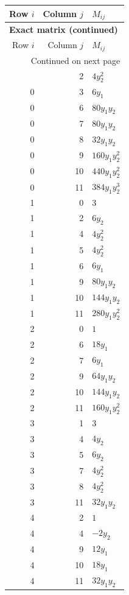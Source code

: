 \documentclass[10pt,a4paper]{article}
\begin{document}
{\small\setlength{\tabcolsep}{7pt}\begin{longtable}{rrp{125mm}}
\toprule Row $i$ & Column $j$ & $M_{ij}$\\\midrule\endfirsthead
\multicolumn{3}{l}{\textbf{Exact matrix (continued)}}\\
\toprule Row $i$ & Column $j$ & $M_{ij}$\\\midrule\endhead
\midrule\multicolumn{3}{r}{Continued on next page}\\\endfoot\bottomrule\endlastfoot
0 & 2 & $4 y_{2}^{2}$\\
0 & 3 & $6 y_{1}$\\
0 & 6 & $80 y_{1} y_{2}$\\
0 & 7 & $80 y_{1} y_{2}$\\
0 & 8 & $32 y_{1} y_{2}$\\
0 & 9 & $160 y_{1} y_{2}^{2}$\\
0 & 10 & $440 y_{1} y_{2}^{2}$\\
0 & 11 & $384 y_{1} y_{2}^{3}$\\
1 & 0 & $3$\\
1 & 2 & $6 y_{2}$\\
1 & 4 & $4 y_{2}^{2}$\\
1 & 5 & $4 y_{2}^{2}$\\
1 & 6 & $6 y_{1}$\\
1 & 9 & $80 y_{1} y_{2}$\\
1 & 10 & $144 y_{1} y_{2}$\\
1 & 11 & $280 y_{1} y_{2}^{2}$\\
2 & 0 & $1$\\
2 & 6 & $18 y_{1}$\\
2 & 7 & $6 y_{1}$\\
2 & 9 & $64 y_{1} y_{2}$\\
2 & 10 & $144 y_{1} y_{2}$\\
2 & 11 & $160 y_{1} y_{2}^{2}$\\
3 & 1 & $3$\\
3 & 4 & $4 y_{2}$\\
3 & 5 & $6 y_{2}$\\
3 & 7 & $4 y_{2}^{2}$\\
3 & 8 & $4 y_{2}^{2}$\\
3 & 11 & $32 y_{1} y_{2}$\\
4 & 2 & $1$\\
4 & 4 & $- 2 y_{2}$\\
4 & 9 & $12 y_{1}$\\
4 & 10 & $18 y_{1}$\\
4 & 11 & $32 y_{1} y_{2}$\\

\end{longtable}}
\end{document}
